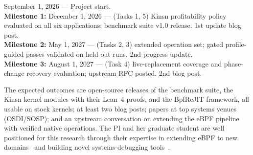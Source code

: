 \noindent September 1, 2026 --- Project start.\\
\textbf{Milestone 1:} December 1, 2026 --- (Tasks 1, 5) Kinsn profitability policy evaluated on all six applications; benchmark suite v1.0 release. 1st update blog post.\\
\textbf{Milestone 2:} May 1, 2027 --- (Tasks 2, 3) extended operation set; gated profile-guided passes validated on held-out runs. 2nd progress update.\\
\textbf{Milestone 3:} August 1, 2027 --- (Task 4) live-replacement coverage and phase-change recovery evaluation; upstream RFC posted. 2nd blog post.

The expected outcomes are open-source releases of the benchmark suite, the Kinsn kernel modules with their Lean~4 proofs, and the BpfReJIT framework, all usable on stock kernels; at least two blog posts; papers at top systems venues (OSDI/SOSP); and an upstream conversation on extending the eBPF pipeline with verified native operations.  The PI and her graduate student are well positioned for this research through their expertise in extending eBPF to new domains~\cite{zheng2025extending,yang2025egpu} and building novel systems-debugging tools~\cite{Quinn_2022_omnitable}.
